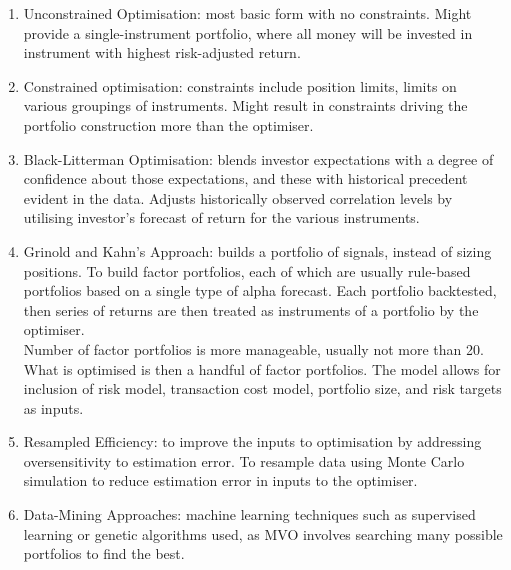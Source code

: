 \begin{method} 
\begin{enumerate}[label=\roman*.]
\setlength{\itemsep}{0pt}
\item Unconstrained Optimisation: most basic form with no constraints. Might provide a single-instrument portfolio, where all money will be invested in instrument with highest risk-adjusted return.
\item Constrained optimisation: constraints include position limits, limits on various groupings of instruments. Might result in constraints driving the portfolio construction more than the optimiser.
\item Black-Litterman Optimisation: blends investor expectations with a degree of confidence about those expectations, and these with historical precedent evident in the data. Adjusts historically observed correlation levels by utilising investor's forecast of return for the various instruments.
\item Grinold and Kahn's Approach: builds a portfolio of signals, instead of sizing positions. To build factor portfolios, each of which are usually rule-based portfolios based on a single type of alpha forecast. Each portfolio backtested, then series of returns are then treated as instruments of a portfolio by the optimiser.\\
Number of factor portfolios is more manageable, usually not more than 20. What is optimised is then a handful of factor portfolios. The model allows for inclusion of risk model, transaction cost model, portfolio size, and risk targets as inputs.
\item Resampled Efficiency: to improve the inputs to optimisation by addressing oversensitivity to estimation error. To resample data using Monte Carlo simulation to reduce estimation error in inputs to the optimiser.
\item Data-Mining Approaches: machine learning techniques such as supervised learning or genetic algorithms used, as MVO involves searching many possible portfolios to find the best.
\end{enumerate}
\end{method}